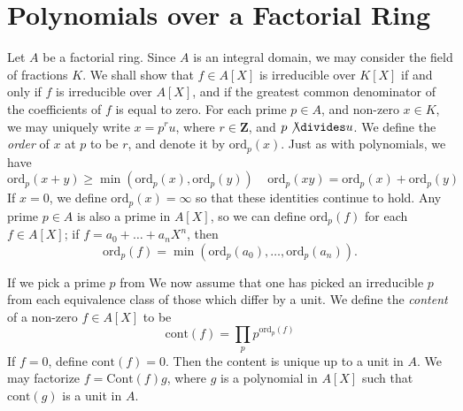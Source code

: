 \section{Polynomials over a Factorial Ring}

Let $A$ be a factorial ring. Since $A$ is an integral domain, we may consider the field of fractions $K$. We shall show that $f \in A[X]$ is irreducible over $K[X]$ if and only if $f$ is irreducible over $A[X]$, and if the greatest common denominator of the coefficients of $f$ is equal to zero. For each prime $p \in A$, and non-zero $x \in K$, we may uniquely write $x = p^r u$, where $r \in \mathbf{Z}$, and $p \not \divides u$. We define the {\it order} of $x$ at $p$ to be $r$, and denote it by $\text{ord}_p(x)$. Just as with polynomials, we have
%
\[ \text{ord}_p(x + y) \geq \min \left( \text{ord}_p(x),  \text{ord}_p(y) \right)\ \ \ \ \ \text{ord}_p(xy) = \text{ord}_p(x) + \text{ord}_p(y) \]
%
If $x = 0$, we define $\text{ord}_p(x) = \infty$ so that these identities continue to hold. Any prime $p \in A$ is also a prime in $A[X]$, so we can define $\text{ord}_p(f)$ for each $f \in A[X]$; if $f = a_0 + \dots + a_n X^n$, then
%
\[ \text{ord}_p(f) = \min \left( \text{ord}_p(a_0), \dots, \text{ord}_p(a_n) \right). \]

%
If we pick a prime $p$ from
We now assume that one has picked an irreducible $p$ from each equivalence class of those which differ by a unit. We define the {\it content} of a non-zero $f \in A[X]$ to be
%
\[ \text{cont}(f) = \prod_p p^{\text{ord}_p(f)} \]
%
If $f = 0$, define $\text{cont}(f) = 0$. Then the content is unique up to a unit in $A$. We may factorize $f = \text{Cont}(f)g$, where $g$ is a polynomial in $A[X]$ such that $\text{cont}(g)$ is a unit in $A$.

